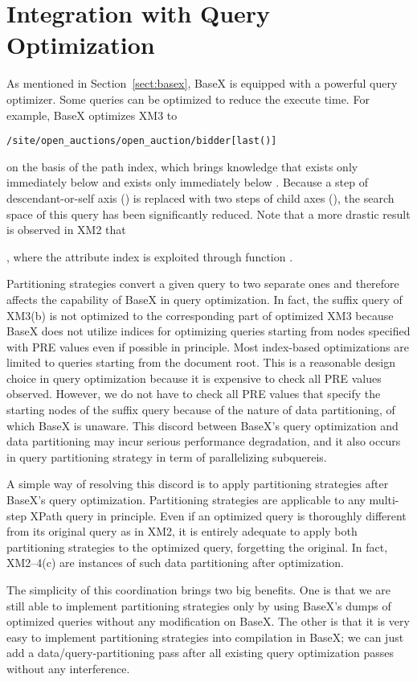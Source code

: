 \section{Integration with Query Optimization}
\label{sect:opt}

As mentioned in Section~\ref{sect:basex}, BaseX is equipped with a powerful
query optimizer. Some queries can be optimized to reduce the execute
time.  For example, BaseX optimizes XM3 to
\begin{lstlisting}
/site/open_auctions/open_auction/bidder[last()]
\end{lstlisting}
on the basis of the path index, which brings knowledge that 
exists only immediately below  and 
exists only immediately below . Because a step of descendant-or-self
axis () is replaced with two steps of child axes
(), the search space of this query has been
significantly reduced. Note that a more drastic result is observed in XM2 that

, where
the attribute index is exploited through function . 

Partitioning strategies convert a given query to two separate ones and therefore
affects the capability of BaseX in query optimization. In fact, the suffix query
of XM3(b) is not optimized to the corresponding part of optimized XM3 because
BaseX does not utilize indices for optimizing queries starting from nodes
specified with PRE values even if possible in principle. Most index-based
optimizations are limited to queries starting from the document root. This is a
reasonable design choice in query optimization because it is expensive to check
all PRE values observed. However, we do not have to check all PRE values that
specify the starting nodes of the suffix query because of the nature of data
partitioning, of which BaseX is unaware. This discord between BaseX's query
optimization and data partitioning may incur serious performance degradation, 
and it also occurs in query partitioning strategy in term of parallelizing subquereis.

A simple way of resolving this discord is to apply partitioning strategies after
BaseX's query optimization. Partitioning strategies are applicable to any
multi-step XPath query in principle. Even if an optimized query is thoroughly
different from its original query as in XM2, it is entirely adequate to apply
both partitioning strategies to the optimized query, forgetting the original. In fact,
XM2--4(c) are instances of such data partitioning after optimization.

The simplicity of this coordination brings two big benefits. One is that we are
still able to implement partitioning strategies only by using BaseX's dumps of
optimized queries without any modification on BaseX. The other is that it is
very easy to implement partitioning strategies into compilation in BaseX; we can
just add a data/query-partitioning pass after all existing query optimization
passes without any interference.
